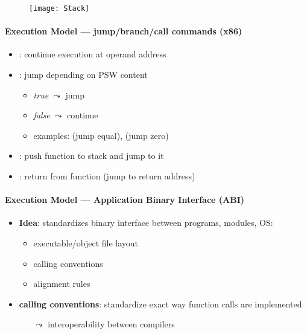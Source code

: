 \begin{figure}[h]\centering\label{Stack}\texttt{[image: Stack]}\end{figure}

\paragraph{Execution Model --- jump/branch/call commands (x86)}
\begin{itemize}
  \item {}: continue execution at operand address
  \item {}: jump depending on PSW content
  \begin{itemize}
    \item \emph{true} \( \leadsto \) jump
    \item \emph{false} \( \leadsto \) continue
    \item examples:  (jump equal),  (jump zero)
  \end{itemize}
  \item {}: push function to stack and jump to it
  \item {}: return from function (jump to return address)
\end{itemize}

\paragraph{Execution Model --- Application Binary Interface (ABI)}
\begin{itemize}
  \item \textbf{Idea}: standardizes binary interface between programs, modules, OS:
  \begin{itemize}
    \item executable/object file layout
    \item calling conventions
    \item alignment rules
  \end{itemize}
  \item \textbf{calling conventions}: standardize exact way function calls are implemented
  \begin{itemize}
    \item[$ \leadsto $] interoperability between compilers
  \end{itemize}
\end{itemize}

